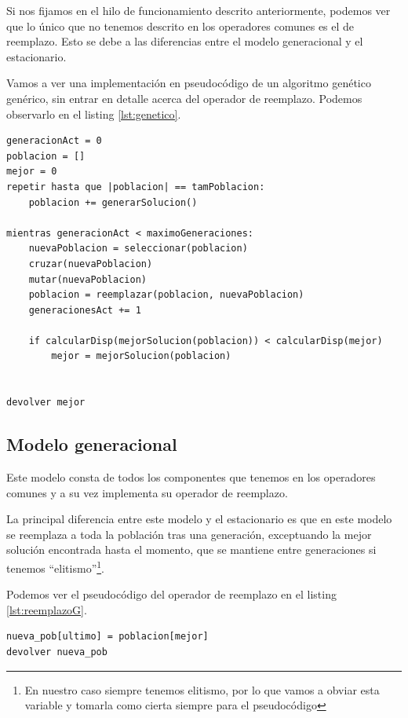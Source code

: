 Si nos fijamos en el hilo de funcionamiento descrito anteriormente, podemos ver que lo único que no tenemos descrito en los operadores comunes es el de reemplazo. Esto se debe a las diferencias entre el modelo generacional y el estacionario.

Vamos a ver una implementación en pseudocódigo de un algoritmo genético genérico, sin entrar en detalle acerca del operador de reemplazo. Podemos observarlo en el listing \ref{lst:genetico}.

\begin{lstlisting}[frame=single, caption={Algoritmo genético}, captionpos=b, label=lst:genetico]
generacionAct = 0
poblacion = []
mejor = 0
repetir hasta que |poblacion| == tamPoblacion:
    poblacion += generarSolucion()

mientras generacionAct < maximoGeneraciones:
    nuevaPoblacion = seleccionar(poblacion)
    cruzar(nuevaPoblacion)
    mutar(nuevaPoblacion)
    poblacion = reemplazar(poblacion, nuevaPoblacion)
    generacionesAct += 1
    
    if calcularDisp(mejorSolucion(poblacion)) < calcularDisp(mejor)
        mejor = mejorSolucion(poblacion)
    

devolver mejor
\end{lstlisting}


\subsection{Modelo generacional}

Este modelo consta de todos los componentes que tenemos en los operadores comunes y a su vez implementa su operador de reemplazo.

La principal diferencia entre este modelo y el estacionario es que en este modelo se reemplaza a toda la población tras una generación, exceptuando la mejor solución encontrada hasta el momento, que se mantiene entre generaciones si tenemos ``elitismo''\footnote{En nuestro caso siempre tenemos elitismo, por lo que vamos a obviar esta variable y tomarla como cierta siempre para el pseudocódigo}.

Podemos ver el pseudocódigo del operador de reemplazo en el listing \ref{lst:reemplazoG}.

\begin{lstlisting}[frame=single, caption={Reemplazo modelo generacional}, captionpos=b, label=lst:reemplazoG]
nueva_pob[ultimo] = poblacion[mejor]
devolver nueva_pob
\end{lstlisting}

